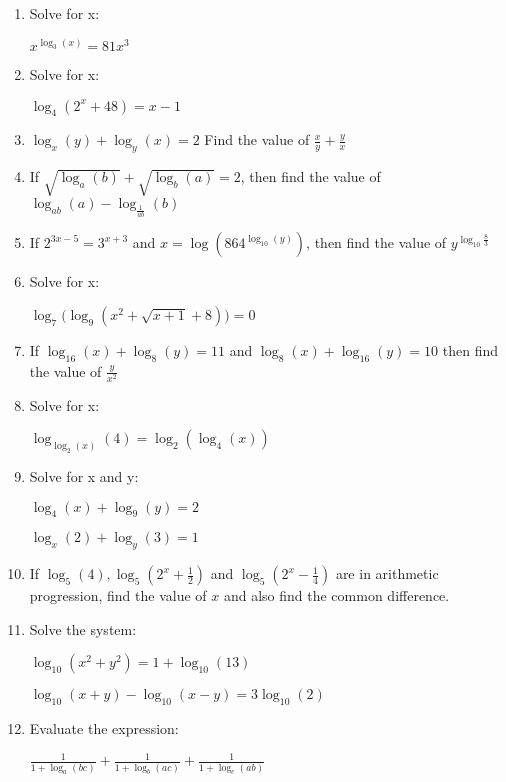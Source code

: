 \documentclass[../main.tex]{subfiles}
\begin{document}
\begin{enumerate}[itemsep=1cm]
    \item Solve for x:
    
    \(x^{\log_3(x)}=81x^3\)
    
    \item Solve for x:
    
    \(\log_4(2^x + 48)=x-1\)

    \item 
    \(\log_x(y)+\log_y(x)=2 \)
    Find the value of \(\frac{x}{y}+\frac{y}{x}\)

    \item 
    If $\sqrt{\log_a(b)}+\sqrt{\log_b(a)}=2$, then find the value of $\log_{ab}(a)-\log_{\frac{1}{ab}}(b)$

    \item 
    If $2^{3x-5}=3^{x+3}$ and $x=\log(864^{\log_{10}(y)})$, then find the value of $y^{\log_{10}\frac{8}{3}}$

    \item 
    Solve for x:

    \(\log_7\bigl(\log_9(x^2+\sqrt{x+1}+8)\bigr)=0\)

    \item 
    If $\log_{16}(x)+\log_8(y)=11$ and $\log_8(x)+\log_{16}(y)=10$ then find the value of $\frac{y}{x^2}$

    \item 
    Solve for x:

    \(\log_{\log_2(x)}(4)=\log_2(\log_4(x)) \)

    \item 
    Solve for x and y:

    \(\log_4(x)+\log_9(y)=2\)

    \(\log_x(2)+\log_y(3)=1\)

    \item 
    If $\log_5(4), \log_5(2^x+\frac{1}{2})$ and $\log_5(2^x-\frac{1}{4})$ are in arithmetic progression, find the value of $x$ and also find the common difference.

    \item 
    Solve the system:

    \(\log_{10}(x^2+y^2)=1+\log_{10}(13)\)

    \(\log_{10}(x+y)-\log_{10}(x-y)=3\log_{10}(2)\)

    \item 
    Evaluate the expression:

    \(\frac{1}{1+\log_a(bc)}+\frac{1}{1+\log_b(ac)}+\frac{1}{1+\log_c(ab)} \)

\end{enumerate}
\end{document}
